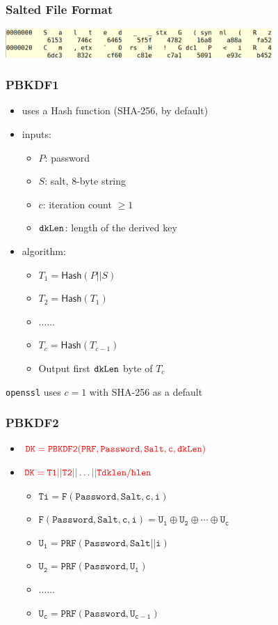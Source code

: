 \documentclass[]{beamer}
\begin{document}
{\begin{frame}
\frametitle{Salted File Format}
\begin{center}
\includegraphics[width=4in]{imgs/saltedFile.png}
\end{center}
\end{frame}

\begin{frame}
\frametitle{PBKDF1}
\begin{itemize}
\item uses a {\sf Hash} function (SHA-256, by default)
\item {\color{blue} inputs}:
    \begin{itemize}
        \item $P$: password
        \item $S$: salt, 8-byte string
        \item $c$: iteration count $\geq 1$
        \item $\tt{dkLen}$: length of the derived key
    \end{itemize}
\item {\color{blue} algorithm}:
    \begin{itemize}
    \item $T_1=\mathsf{Hash}(P||S)$
    \item $T_2=\mathsf{Hash}(T_1)$
    \item $\ldots\ldots$
    \item $T_c=\mathsf{Hash}(T_{c-1})$
    \item Output first $\tt{dkLen}$ byte of $T_c$
\end{itemize}
\end{itemize}
{\tt openssl} uses $c=1$ with SHA-256 as a default
\end{frame}

\begin{frame}
\frametitle{PBKDF2}
\begin{itemize}
\item $\color{red}\mathtt{DK = PBKDF2(PRF, Password, Salt, c, dkLen)}$
\item $\color{red}\mathtt{DK = T1|| T2 ||\ldots ||Tdklen/hlen}$
    \begin{itemize}
       \item $\mathtt{Ti = F(Password, Salt, c, i)}$
       \item $\mathtt{F(Password,Salt,c,i)=U_1\oplus U_2\oplus\cdots\oplus U_c}$
       \item $\mathtt{U_1=PRF(Password, Salt||i)}$
       \item $\mathtt{U_2=PRF(Password, U_1)}$
       \item $\ldots\ldots$
       \item $\mathtt{U_c=PRF(Password, U_{c-1})}$
    \end{itemize}


\end{itemize}
\end{frame}}
\end{document}
